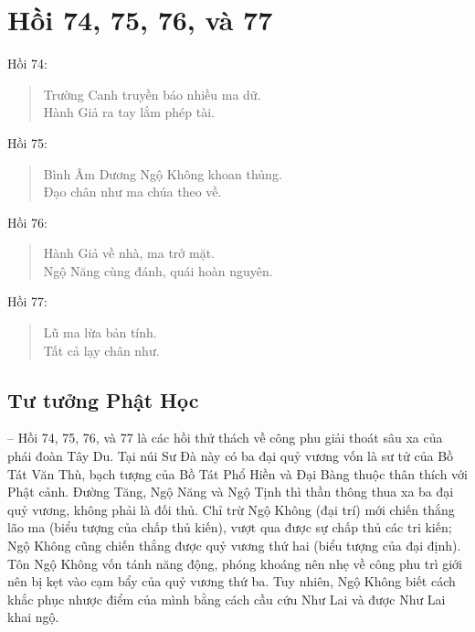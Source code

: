 \chapter{Hồi 74, 75, 76, và 77} %
\label{cha:hoi_74_75}

Hồi 74:

\begin{verse}
\begin{itshape}
Trường Canh truyền báo nhiều ma dữ.\\
Hành Giả ra tay lắm phép tài.
\end{itshape}
\end{verse}

Hồi 75:

\begin{verse}
\begin{itshape}
Bình Âm Dương Ngộ Không khoan thủng.\\
Đạo chân như ma chúa theo về.
\end{itshape}
\end{verse}

Hồi 76:

\begin{verse}
\begin{itshape}
Hành Giả về nhà, ma trở mặt.\\
Ngộ Năng cùng đánh, quái hoàn nguyên.
\end{itshape}
\end{verse}

Hồi 77:

\begin{verse}
\begin{itshape}
Lũ ma lừa bản tính.\\
Tất cả lạy chân như.
\end{itshape}
\end{verse}

\section{Tư tưởng Phật Học} %
\label{sec:74_75_phat_hoc}

-- Hồi 74, 75, 76, và 77 là các hồi thử thách về công phu giải thoát sâu xa của phái đoàn Tây Du. Tại núi Sư Đà này có ba đại quỷ vương vốn là sư tử của Bồ Tát Văn Thù, bạch tượng của Bồ Tát Phổ Hiền và Đại Bàng thuộc thân thích với Phật cảnh. Đường Tăng, Ngộ Năng và Ngộ Tịnh thì thần thông thua xa ba đại quỷ vương, không phải là đối thủ. Chỉ trừ Ngộ Không (đại trí) mới chiến thắng lão ma (biểu tượng của chấp thủ kiến), vượt qua được sự chấp thủ các tri kiến; Ngộ Không cũng chiến thắng được quỷ vương thứ hai (biểu tượng của đại định). Tôn Ngộ Không vốn tánh năng động, phóng khoáng nên nhẹ về công phu trì giới nên bị kẹt vào cạm bẩy của quỷ vương thứ ba. Tuy nhiên, Ngộ Không biết cách khắc phục nhược điểm của mình bằng cách cầu cứu Như Lai và được Như Lai khai ngộ.

